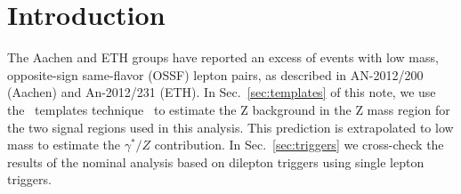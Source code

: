 \section{Introduction}
\label{ref:intro}

The Aachen and ETH groups have reported an excess of events with low mass, opposite-sign same-flavor (OSSF) lepton pairs,
as described in AN-2012/200 (Aachen) and An-2012/231 (ETH). In Sec.~\ref{sec:templates} of this note, we use the \MET\ templates 
technique~\cite{ref:Zpaper} to estimate the Z background in the Z mass region for the two signal regions used in this analysis. 
This prediction is extrapolated to low mass to estimate the $\gamma^*/Z$ contribution. In Sec.~\ref{sec:triggers} we cross-check 
the results of the nominal analysis based on dilepton triggers using single lepton triggers.

